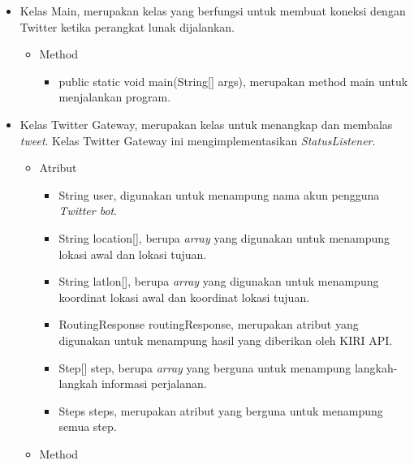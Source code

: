 \begin{itemize}
		\item Kelas Main, merupakan kelas yang berfungsi untuk membuat koneksi dengan Twitter ketika perangkat lunak dijalankan.
		
				\begin{itemize}
							\item Method
							
									\begin{itemize}
												\item public static void main(String[] args), merupakan method main untuk menjalankan program.
										
									\end{itemize}
				\end{itemize}
		
		\item Kelas Twitter Gateway, merupakan kelas untuk menangkap dan membalas \textit{tweet}. Kelas Twitter Gateway ini mengimplementasikan \textit{StatusListener}.
		
		
				\begin{itemize}
							\item Atribut
							
							
									\begin{itemize}
												\item String user, digunakan untuk menampung nama akun pengguna \textit{Twitter bot}.
												\item String location[], berupa \textit{array} yang digunakan untuk menampung lokasi awal dan lokasi tujuan.
												\item String latlon[], berupa \textit{array} yang digunakan untuk menampung koordinat lokasi awal dan koordinat lokasi tujuan.
												\item RoutingResponse routingResponse, merupakan atribut yang digunakan untuk menampung hasil yang diberikan oleh KIRI API.
												\item Step[] step, berupa \textit{array} yang berguna untuk menampung langkah-langkah informasi perjalanan.
												\item Steps steps, merupakan atribut yang berguna untuk menampung semua step.
									\end{itemize}
							
							\item Method
							

\end{itemize}
\end{itemize}
